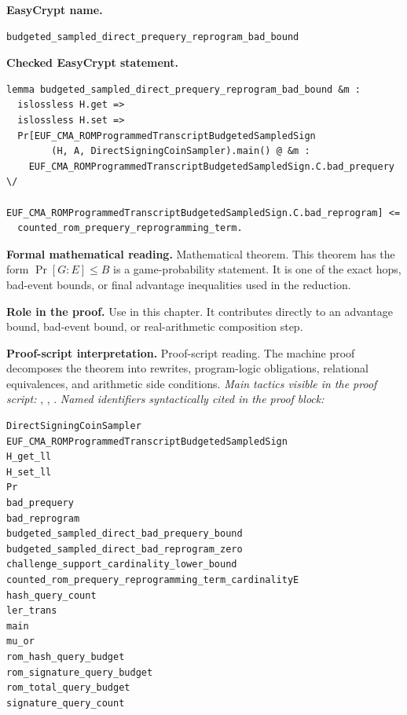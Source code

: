 \begin{formaltheorem}
\noindent\textbf{EasyCrypt name.}
\begin{lstlisting}[language=EasyCrypt,basicstyle=\ttfamily\scriptsize]
budgeted_sampled_direct_prequery_reprogram_bad_bound
\end{lstlisting}
\noindent\textbf{Checked EasyCrypt statement.}
\begin{lstlisting}[language=EasyCrypt,basicstyle=\ttfamily\scriptsize]
lemma budgeted_sampled_direct_prequery_reprogram_bad_bound &m :
  islossless H.get =>
  islossless H.set =>
  Pr[EUF_CMA_ROMProgrammedTranscriptBudgetedSampledSign
        (H, A, DirectSigningCoinSampler).main() @ &m :
    EUF_CMA_ROMProgrammedTranscriptBudgetedSampledSign.C.bad_prequery \/
    EUF_CMA_ROMProgrammedTranscriptBudgetedSampledSign.C.bad_reprogram] <=
  counted_rom_prequery_reprogramming_term.
\end{lstlisting}
\noindent\textbf{Formal mathematical reading.}
Mathematical theorem. This theorem has the form \(\Pr[G:E] \le B\) is a game-probability statement.  It is one of the exact hops, bad-event bounds, or final advantage inequalities used in the reduction.

\noindent\textbf{Role in the proof.}
Use in this chapter. It contributes directly to an advantage bound, bad-event bound, or real-arithmetic composition step.

\noindent\textbf{Proof-script interpretation.}
Proof-script reading. The machine proof decomposes the theorem into rewrites, program-logic obligations, relational equivalences, and arithmetic side conditions.
\emph{Main tactics visible in the proof script:} , , .
\emph{Named identifiers syntactically cited in the proof block:}
\begin{lstlisting}[language=EasyCrypt,basicstyle=\ttfamily\scriptsize]
DirectSigningCoinSampler
EUF_CMA_ROMProgrammedTranscriptBudgetedSampledSign
H_get_ll
H_set_ll
Pr
bad_prequery
bad_reprogram
budgeted_sampled_direct_bad_prequery_bound
budgeted_sampled_direct_bad_reprogram_zero
challenge_support_cardinality_lower_bound
counted_rom_prequery_reprogramming_term_cardinalityE
hash_query_count
ler_trans
main
mu_or
rom_hash_query_budget
rom_signature_query_budget
rom_total_query_budget
signature_query_count
\end{lstlisting}

\end{formaltheorem}

